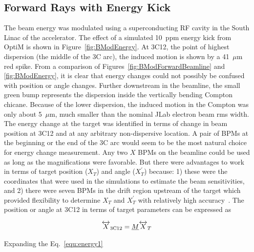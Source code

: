 \subsection{Forward Rays with Energy Kick}
\label{Forward Rays with Energy Kick}
The beam energy was modulated using a superconducting RF cavity in the South Linac of the accelerator. The effect of a simulated 10~ppm energy kick from OptiM is shown in Figure~\ref{fig:BModEnergy}.  At 3C12, the point of highest dispersion (the middle of the 3C arc), the induced motion is shown by a 41~$\mu$m red spike.  From a comparison of Figures~\ref{fig:BModForwardBeamline} and \ref{fig:BModEnergy}, it is clear that energy changes could not possibly be confused with position or angle changes. Further downstream in the beamline, the small green bump represents the dispersion inside the vertically bending Compton chicane. Because of the lower dispersion, the induced motion in the Compton was only about 5~$\mu$m, much smaller than the nominal JLab electron beam rms width. 
The energy change at the target was identified in terms of change in beam position at 3C12 and at any arbitrary non-dispersive location. A pair of BPMs at the beginning or the end of the 3C arc would seem to be the most natural choice for energy change measurement. Any two $X$ BPMs on the beamline could be used as long as the magnifications were favorable. But there were advantages to work in terms of target position ($X_{T}$) and angle ($X^{\prime}_{T}$) because: 1) these were the coordinates that were used in the simulations to estimate the beam sensitivities, and 2) there were seven BPMs in the drift region upstream of the target which provided flexibility to determine $X_{T}$ and $X^{\prime}_{T}$ with relatively high accuracy~\cite{nur_linear_reg}. 
The position or angle at 3C12 in terms of target parameters can be expressed as

\begin{equation} \label{equ:energy1}
\overleftrightarrow{X}_{\rm 3C12} = \underline{M} \overleftrightarrow{X}_{T}
\end{equation}

Expanding the Eq.~\ref{equ:energy1}

